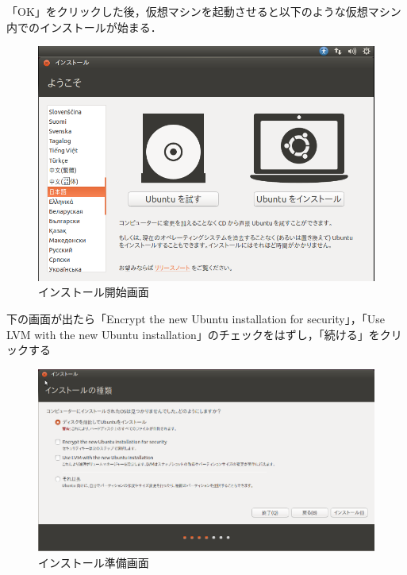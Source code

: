 「OK」をクリックした後，仮想マシンを起動させると以下のような仮想マシン内でのインストールが始まる．

\begin{figure}[htb]
\centering
\includegraphics[width=15cm]{ubuntuinstall3.png}
\caption{インストール開始画面}\label{インストール開始画面}
\end{figure}

下の画面が出たら「Encrypt the new Ubuntu installation for security」，「Use LVM with the new Ubuntu installation」のチェックをはずし，「続ける」をクリックする
\begin{figure}[htb]
\centering
\includegraphics[width=15cm]{ubuntuinstall2.png}
\caption{インストール準備画面}\label{インストール準備画面}
\end{figure}

